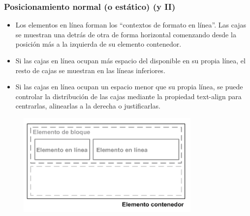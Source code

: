 \begin{frame}
\frametitle{Posicionamiento normal (o estático) (y II)}

\begin{itemize}
  \item Los elementos en línea forman los ``contextos de formato en línea''. Las cajas se muestran una detrás de otra de forma horizontal comenzando desde la posición más a la izquierda de su elemento contenedor.
  \item Si las cajas en línea ocupan más espacio del disponible en su propia línea, el resto de cajas se muestran en las líneas inferiores. 
  \item Si las cajas en línea ocupan un espacio menor que su propia línea, se puede controlar la distribución de las cajas mediante la propiedad text-align para centrarlas, alinearlas a la derecha o justificarlas.
\end{itemize}


\begin{center}
\begin{figure}[p]
\includegraphics[width=0.8\textwidth]{figs/f0503.png}
\end{figure}
\end{center}

\end{frame}



